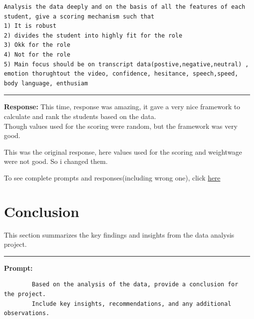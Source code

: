 \documentclass[11pt,a4paper]{article}
\begin{document}
\begin{tcolorbox}[title=Refined Prompt]
    \begin{lstlisting}
Analysis the data deeply and on the basis of all the features of each student, give a scoring mechanism such that
1) It is robust
2) divides the student into highly fit for the role
3) Okk for the role
4) Not for the role
5) Main focus should be on transcript data(postive,negative,neutral) , emotion thorughtout the video, confidence, hesitance, speech,speed, body language, enthusiam
    \end{lstlisting}
\end{tcolorbox}
\begin{center}
    \color{red}\rule{1\linewidth}{0.5mm}
\end{center}


\textbf{Response:}
This time, response was amazing, it gave a very nice framework to calculate and rank the students based on the data.\\
Though values used for the scoring were random, but the framework was very good.\\

\begin{tcolorbox}[title=Response]
    
\end{tcolorbox}

\Large{This was the original response, here values used for the scoring and weightwage were not good. So i changed them.}

\Large{To see complete prompts and responses(including wrong one), click \href{https://chatgpt.com/share/66eac84c-2c84-800f-b800-e42a0607ce97}{here}}




\section{Conclusion}
\label{sec:conclusion}
This section summarizes the key findings and insights from the data analysis project.
\begin{center}
    \color{red}\rule{1\linewidth}{1mm}
\end{center}
\textbf{Prompt:}

\begin{tcolorbox}[title=Prompt]
    \begin{lstlisting}
        Based on the analysis of the data, provide a conclusion for the project. 
        Include key insights, recommendations, and any additional observations.
    \end{lstlisting}
\end{tcolorbox}
\end{document}

